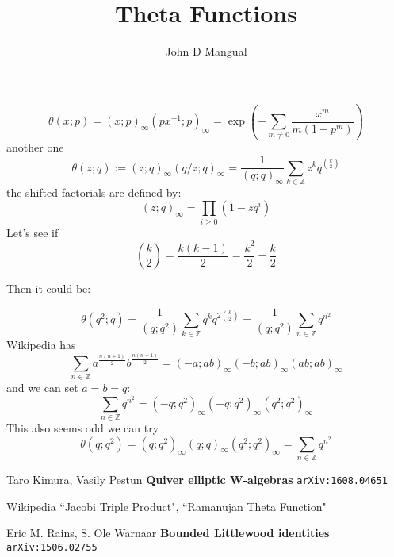 \documentclass[12pt]{article}
\title{\textbf{ Theta Functions }}
\author{John D Mangual}
\date{}
\begin{document}
\selectfont \fontsize{25}{30}\selectfont

\maketitle

$$\theta(x; p) = (x;p)_\infty (px^{-1}; p)_\infty = \exp \left( - \sum_{ m \neq 0} \frac{x^m}{m(1-p^m)} \right) $$
another one
$$\theta(z; q) := (z;q)_\infty (q/z ;q)_\infty = \frac{1}{(q;q)_\infty} \sum_{k \in \mathbb{Z}} z^k q^{\binom{k}{2}}  $$
the shifted factorials are defined by:
$$ (z;q)_\infty = \prod_{i \geq 0} (1 - z q^i)$$
Let's see if
$$ \binom{k}{2} = \frac{k(k-1)}{2} = \frac{k^2}{2} - \frac{k}{2}$$

\newpage

\noindent Then it could be:

$$ \theta( q^2 ; q) = \frac{1}{(q; q^2) }
\sum_{k \in \mathbb{Z}} q^k q^{2\binom{k}{2}}
 = \frac{1}{(q; q^2) }
\sum_{n \in \mathbb{Z}}  q^{n^2}
$$
Wikipedia has
$$ \sum_{n \in \mathbb{Z}}
a^{\frac{n(n+1)}{2}}
b^{\frac{n(n-1)}{2}}
= (-a; ab)_\infty (-b; ab)_\infty (ab; ab)_\infty
$$
and we can set $a = b = q$:
$$
\sum_{n \in \mathbb{Z}}
q^{n^2}
= (-q; q^2)_\infty (-q; q^2)_\infty (q^2; q^2)_\infty
 $$
 This also seems odd we can try
$$ \theta(q;q^2)
= (q;q^2)_\infty (q;q)_\infty (q^2; q^2)_\infty = \sum_{n \in \mathbb{Z}}q^{n^2}$$

\newpage

\selectfont \fontsize{12}{10}\selectfont

\begin{thebibliography}{}

\item Taro Kimura, Vasily Pestun \textbf{Quiver elliptic W-algebras} \texttt{arXiv:1608.04651}
\item Wikipedia ``Jacobi Triple Product", ``Ramanujan Theta Function"
\item Eric M. Rains, S. Ole Warnaar \textbf{Bounded Littlewood identities} \texttt{arXiv:1506.02755}

\end{thebibliography}
\end{document}
